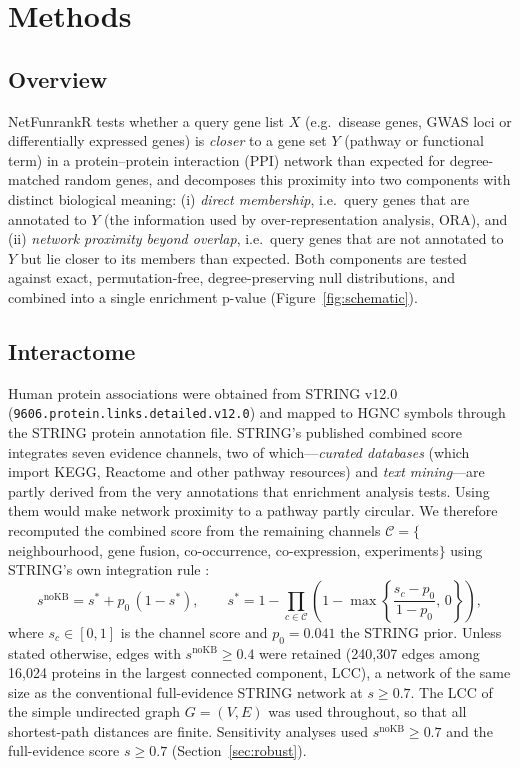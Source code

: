 \section{Methods}\label{sec:methods}

\subsection{Overview}
NetFunrankR tests whether a query gene list $X$ (e.g.\ disease genes, GWAS loci or differentially expressed genes) is \emph{closer} to a gene set $Y$ (pathway or functional term) in a protein--protein interaction (PPI) network than expected for degree-matched random genes, and decomposes this proximity into two components with distinct biological meaning: (i) \emph{direct membership}, i.e.\ query genes that are annotated to $Y$ (the information used by over-representation analysis, ORA), and (ii) \emph{network proximity beyond overlap}, i.e.\ query genes that are not annotated to $Y$ but lie closer to its members than expected. Both components are tested against exact, permutation-free, degree-preserving null distributions, and combined into a single enrichment p-value (Figure~\ref{fig:schematic}).

\subsection{Interactome}\label{sec:interactome}
Human protein associations were obtained from STRING v12.0 \citep{Szklarczyk2023} (\texttt{9606.protein.links.detailed.v12.0}) and mapped to HGNC symbols through the STRING protein annotation file. STRING's published combined score integrates seven evidence channels, two of which---\emph{curated databases} (which import KEGG, Reactome and other pathway resources) and \emph{text mining}---are partly derived from the very annotations that enrichment analysis tests. Using them would make network proximity to a pathway partly circular. We therefore recomputed the combined score from the remaining channels $\mathcal{C} = \{$neighbourhood, gene fusion, co-occurrence, co-expression, experiments$\}$ using STRING's own integration rule \citep{vonMering2005}:
\begin{equation}
s^{\mathrm{noKB}} = s^{*} + p_0\,(1 - s^{*}),\qquad
s^{*} = 1 - \prod_{c \in \mathcal{C}} \left(1 - \max\!\left\{\frac{s_c - p_0}{1 - p_0},\, 0\right\}\right),
\label{eq:string}
\end{equation}
where $s_c \in [0,1]$ is the channel score and $p_0 = 0.041$ the STRING prior. Unless stated otherwise, edges with $s^{\mathrm{noKB}} \ge 0.4$ were retained (240,307 edges among 16,024 proteins in the largest connected component, LCC), a network of the same size as the conventional full-evidence STRING network at $s \ge 0.7$. The LCC of the simple undirected graph $G = (V, E)$ was used throughout, so that all shortest-path distances are finite. Sensitivity analyses used $s^{\mathrm{noKB}} \ge 0.7$ and the full-evidence score $s \ge 0.7$ (Section~\ref{sec:robust}).

